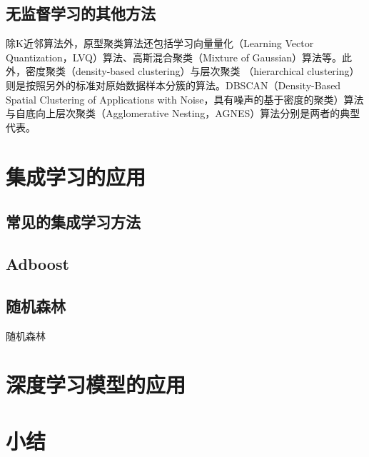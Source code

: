\subsection{无监督学习的其他方法}
除K近邻算法外，原型聚类算法还包括学习向量量化（Learning Vector Quantization，LVQ）算法、高斯混合聚类（Mixture of Gaussian）算法等。此外，密度聚类（density-based clustering）与层次聚类
（hierarchical clustering）则是按照另外的标准对原始数据样本分簇的算法。DBSCAN（Density-Based Spatial Clustering of Applications with Noise，具有噪声的基于密度的聚类）算法
与自底向上层次聚类（Agglomerative Nesting，AGNES）算法分别是两者的典型代表\cite{Zhou2016}。

\section{集成学习的应用}
\subsection{常见的集成学习方法}
\subsection{Adboost}
\subsection{随机森林}
随机森林

\section{深度学习模型的应用}
\section{小结}
